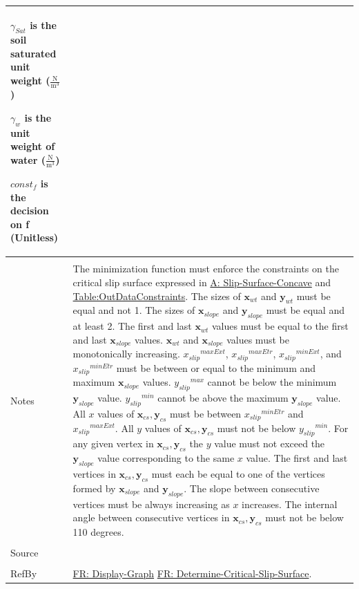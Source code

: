 \documentclass[12pt]{article}
\begin{document}
\begin{minipage}{\textwidth}
\begin{tabular}{p{} p{}}
\begin{symbDescription}
              \item{${γ_{Sat}}$ is the soil saturated unit weight ($\frac{\text{N}}{\text{m}^{3}}$)}
              \item{${γ_{w}}$ is the unit weight of water ($\frac{\text{N}}{\text{m}^{3}}$)}
              \item{$const_f$ is the decision on f (Unitless)}
              \end{symbDescription}
\\ \midrule \\
Notes & The minimization function must enforce the constraints on the critical slip surface expressed in \hyperref[assumpSSC]{A: Slip-Surface-Concave} and \hyperref[Table:OutDataConstraints]{Table:OutDataConstraints}. The sizes of ${\mathbf{x}_{wt}}$ and ${\mathbf{y}_{wt}}$ must be equal and not 1. The sizes of ${\mathbf{x}_{slope}}$ and ${\mathbf{y}_{slope}}$ must be equal and at least 2. The first and last ${\mathbf{x}_{wt}}$ values must be equal to the first and last ${\mathbf{x}_{slope}}$ values. ${\mathbf{x}_{wt}}$ and ${\mathbf{x}_{slope}}$ values must be monotonically increasing. ${{x_{slip}}^{maxExt}}$, ${{x_{slip}}^{maxEtr}}$, ${{x_{slip}}^{minExt}}$, and ${{x_{slip}}^{minEtr}}$ must be between or equal to the minimum and maximum ${\mathbf{x}_{slope}}$ values. ${{y_{slip}}^{max}}$ cannot be below the minimum ${\mathbf{y}_{slope}}$ value. ${{y_{slip}}^{min}}$ cannot be above the maximum ${\mathbf{y}_{slope}}$ value. All $x$ values of ${\mathbf{x}_{cs}},{\mathbf{y}_{cs}}$ must be between ${{x_{slip}}^{minEtr}}$ and ${{x_{slip}}^{maxExt}}$. All $y$ values of ${\mathbf{x}_{cs}},{\mathbf{y}_{cs}}$ must not be below ${{y_{slip}}^{min}}$. For any given vertex in ${\mathbf{x}_{cs}},{\mathbf{y}_{cs}}$ the $y$ value must not exceed the ${\mathbf{y}_{slope}}$ value corresponding to the same $x$ value. The first and last vertices in ${\mathbf{x}_{cs}},{\mathbf{y}_{cs}}$ must each be equal to one of the vertices formed by ${\mathbf{x}_{slope}}$ and ${\mathbf{y}_{slope}}$. The slope between consecutive vertices must be always increasing as $x$ increases. The internal angle between consecutive vertices in ${\mathbf{x}_{cs}},{\mathbf{y}_{cs}}$ must not be below 110 degrees.
\\ \midrule \\
Source & \cite{li2010}
\\ \midrule \\
RefBy & \hyperref[displayGraph]{FR: Display-Graph} \hyperref[determineCritSlip]{FR: Determine-Critical-Slip-Surface}.
\\ \bottomrule \end{tabular}
\end{minipage}
\end{document}
